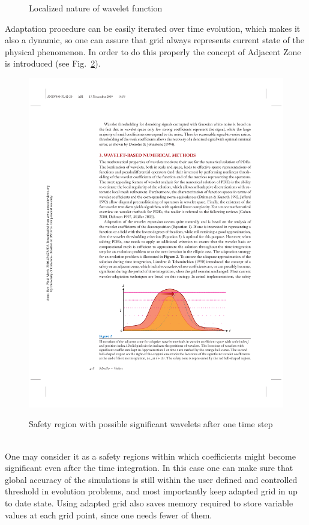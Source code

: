\begin{figure}[t]
\begin{minipage}{0.5\linewidth}
\end{minipage}
\caption{Localized nature of wavelet function \cite{wlt:main}} \label{fig:wlt}
\end{figure}

Adaptation procedure can be easily iterated over time evolution, which makes it also a dynamic, so one can assure that grid always represents current state of the physical phenomenon. In order to do this properly the concept of Adjacent Zone is introduced \cite{lib:adjacent} (see Fig.~\ref{fig:wlt_adj}).
\begin{figure}[h!]
\centering \includegraphics[scale=1]{fig/wlt_adj.pdf}\\
\caption{Safety region with possible significant wavelets after one time step \cite{lib:wlt_main} \label{fig:wlt_adj}}
\end{figure}\\
One may consider it as a safety regions within which coefficients might become significant even after the time integration. In this case one can make sure that global accuracy of the simulations is still within the user defined and controlled threshold in evolution problems, and most importantly keep adapted grid in up to date state. Using adapted grid also saves memory required to store variable values at each grid point, since one needs fewer of them.

